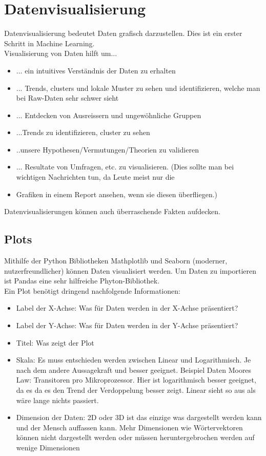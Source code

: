 \section{Datenvisualisierung}
Datenvisualisierung bedeutet Daten grafisch darzustellen. Dies ist ein erster Schritt in Machine Learning.\\
Visualisierung von Daten hilft um...
\begin{itemize}
\item ... ein intuitives Verständnis der Daten zu erhalten
\item ... Trends, clusters und lokale Muster zu sehen und identifizieren, welche man bei Raw-Daten sehr schwer sieht
\item ... Entdecken von Ausreissern und ungewöhnliche Gruppen
\item ...Trends zu identifizieren, cluster zu sehen
\item ..unsere Hypothesen/Vermutungen/Theorien zu validieren
\item ... Resultate von Umfragen, etc. zu visualisieren. (Dies sollte man bei wichtigen Nachrichten tun, da Leute meist nur die
\item Grafiken in einem Report ansehen, wenn sie diesen überfliegen.)
\end{itemize}
Datenvisualisierungen können auch überraschende Fakten aufdecken.
\subsection{Plots}
Mithilfe der Python Bibliotheken Mathplotlib und Seaborn (moderner, nutzerfreundlicher) können Daten visualisiert werden.
Um Daten zu importieren ist Pandas eine sehr hilfreiche Phyton-Bibliothek.\\
Ein Plot benötigt dringend nachfolgende Informationen:
\begin{itemize}
\item Label der X-Achse: Was für Daten werden in der X-Achse präsentiert?
\item Label der Y-Achse: Was für Daten werden in der Y-Achse präsentiert?
\item Titel: Was zeigt der Plot
\item Skala: Es muss entschieden werden zwischen Linear und Logarithmisch. Je nach dem andere Aussagekraft und besser geeignet. Beispiel Daten Moores Law: Transitoren pro Mikroprozessor. Hier ist logarithmisch besser geeignet, da es da es den Trend der Verdoppelung besser zeigt. Linear sieht so aus als wäre lange nichts passiert.
\item Dimension der Daten: 2D oder 3D ist das einzige was dargestellt werden kann und der Mensch auffassen kann. Mehr Dimensionen wie Wörtervektoren können nicht dargestellt werden oder müssen heruntergebrochen werden auf wenige Dimensionen
\end{itemize}

